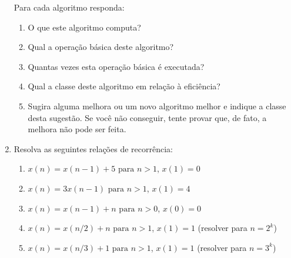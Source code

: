 \documentclass{article}
\begin{document}
\begin{enumerate}
    Para cada algoritmo responda:
    \begin{enumerate}
        \item O que este algoritmo computa?
        \item Qual a operação básica deste algoritmo?
        \item Quantas vezes esta operação básica é executada?
        \item Qual a classe deste algoritmo em relação à eficiência?
        \item Sugira alguma melhora ou um novo algoritmo melhor e indique a classe desta sugestão. Se você não conseguir, tente provar que, de fato, a melhora não pode ser feita. 
    \end{enumerate}
    
    
    
    
    
    \item Resolva as seguintes relações de recorrência:
    \begin{enumerate}
        \item $x(n) = x(n-1) + 5 \text{ para } n>1$, $x(1)=0$
        \item $x(n) = 3x(n-1)\text{ para } n>1$, $x(1)=4$
        \item $x(n) = x(n-1) + n \text{ para } n>0$, $x(0)=0$
        \item $x(n) = x(n/2) + n \text{ para } n>1$, $x(1)=1$ (resolver para $n = 2^k$)
        \item $x(n) = x(n/3) + 1 \text{ para } n>1$, $x(1)=1$ (resolver para $n = 3^k$)
    \end{enumerate}
    

\end{enumerate}
\end{document}
